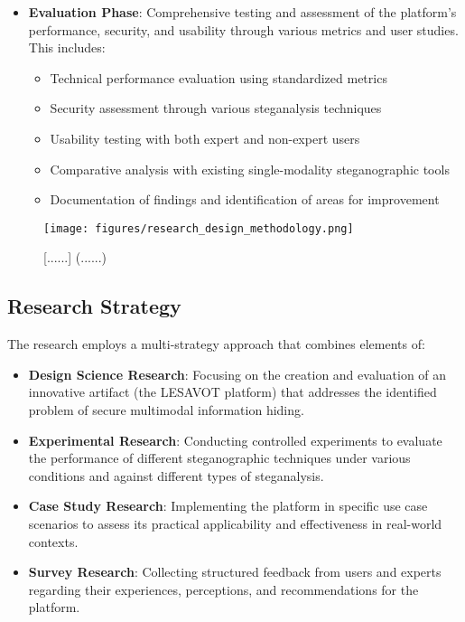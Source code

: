 \documentclass[12pt, a4paper, oneside]{book}
\begin{document}
\begin{itemize}[leftmargin=*]
    \item \textbf{Evaluation Phase}: Comprehensive testing and assessment of the platform's performance, security, and usability through various metrics and user studies. This includes:
    \begin{itemize}
        \item Technical performance evaluation using standardized metrics
        \item Security assessment through various steganalysis techniques
        \item Usability testing with both expert and non-expert users
        \item Comparative analysis with existing single-modality steganographic tools
        \item Documentation of findings and identification of areas for improvement
    \end{itemize}
\end{itemize}

\begin{figure}[htbp]
    \centering
    \texttt{[image: figures/research\_design\_methodology.png]}
    \caption{[......] (......)}
    \label{fig:research_design}
\end{figure}

\subsection{Research Strategy}

The research employs a multi-strategy approach that combines elements of:

\begin{itemize}[leftmargin=*]
    \item \textbf{Design Science Research}: Focusing on the creation and evaluation of an innovative artifact (the LESAVOT platform) that addresses the identified problem of secure multimodal information hiding.

    \item \textbf{Experimental Research}: Conducting controlled experiments to evaluate the performance of different steganographic techniques under various conditions and against different types of steganalysis.

    \item \textbf{Case Study Research}: Implementing the platform in specific use case scenarios to assess its practical applicability and effectiveness in real-world contexts.

    \item \textbf{Survey Research}: Collecting structured feedback from users and experts regarding their experiences, perceptions, and recommendations for the platform.
\end{itemize}
\end{document}
